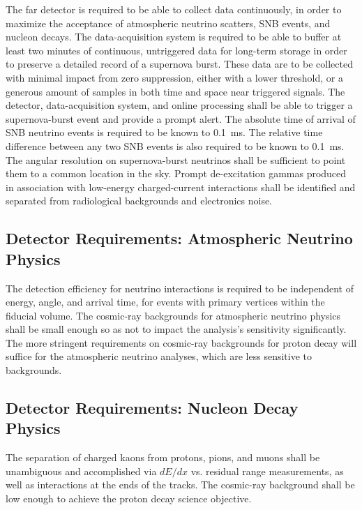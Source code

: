 The far detector is required to be able to collect data continuously,
in order to maximize the acceptance of atmospheric neutrino scatters,
SNB events, and nucleon decays.  The data-acquisition system is
required to be able to buffer at least two minutes of continuous, 
untriggered data for long-term storage in order to preserve a detailed
record of a supernova burst.  These data are to be collected with minimal impact
from zero suppression, either with a lower threshold, or a generous amount of samples
in both time and space near triggered signals. The detector, data-acquisition system, and
online processing shall be able to trigger a supernova-burst event and
provide a prompt alert. The absolute time of arrival of SNB
neutrino events is required to be known to 0.1~ms.  The relative time
difference between any two SNB events is also required to be known to
0.1~ms.  The angular resolution on supernova-burst neutrinos shall be
sufficient to point them to a common location in the sky.  Prompt de-excitation
gammas produced in association with low-energy charged-current interactions
shall be identified and separated from radiological backgrounds and electronics noise.

\subsection{Detector Requirements: Atmospheric Neutrino Physics}

The detection efficiency for neutrino interactions is required to be
independent of energy, angle, and arrival time, for events with
primary vertices within the fiducial volume.  The cosmic-ray backgrounds
for atmospheric neutrino physics shall be small enough so as not to impact
the analysis's sensitivity significantly.  The more stringent requirements
on cosmic-ray backgrounds for proton decay will suffice for the atmospheric
neutrino analyses, which are less sensitive to backgrounds.

\subsection{Detector Requirements: Nucleon Decay Physics}

The separation of charged kaons from protons, pions, and muons shall be unambiguous
and accomplished
via $dE/dx$ vs. residual range measurements, as well as interactions at the
ends of the tracks.  The cosmic-ray background shall be low enough to achieve the
proton decay science objective.  

